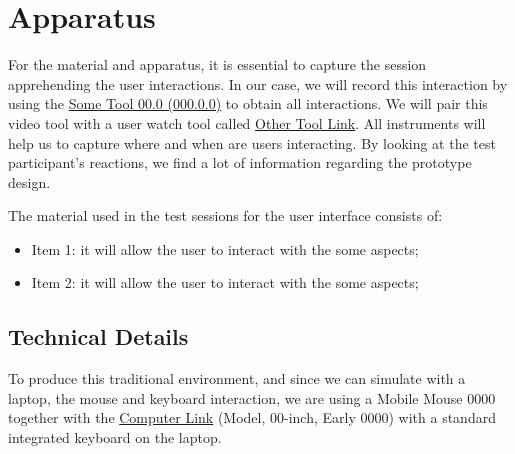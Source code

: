 
\section{Apparatus}
\label{sec:sec005}

For the material and apparatus, it is essential to capture the session apprehending the user interactions. In our case, we will record this interaction by using the \hyperlink{}{Some Tool 00.0 (000.0.0)} to obtain all interactions. We will pair this video tool with a user watch tool called \hyperlink{}{Other Tool Link}. All instruments will help us to capture where and when are users interacting. By looking at the test participant's reactions, we find a lot of information regarding the prototype design.

\hfill

The material used in the test sessions for the user interface consists of:

\begin{itemize}
\item Item 1: it will allow the user to interact with the some aspects;
\item Item 2: it will allow the user to interact with the some aspects;
\end{itemize}


\subsection{Technical Details}

To produce this traditional environment, and since we can simulate with a laptop, the mouse and keyboard interaction, we are using a Mobile Mouse 0000 together with the \hyperlink{}{Computer Link} (Model, 00-inch, Early 0000) with a standard integrated keyboard on the laptop.


